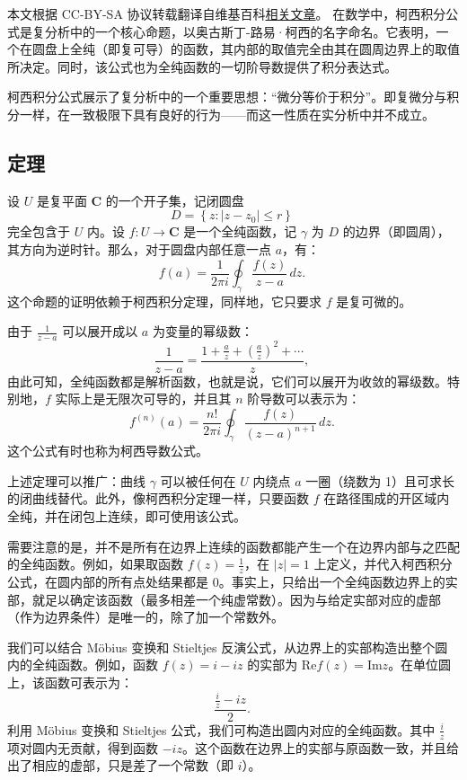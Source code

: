 
本文根据 CC-BY-SA 协议转载翻译自维基百科\href{https://en.wikipedia.org/wiki/Cauchy\%27s_integral_formula}{相关文章}。
在数学中，柯西积分公式是复分析中的一个核心命题，以奥古斯丁-路易·柯西的名字命名。它表明，一个在圆盘上全纯（即复可导）的函数，其内部的取值完全由其在圆周边界上的取值所决定。同时，该公式也为全纯函数的一切阶导数提供了积分表达式。

柯西积分公式展示了复分析中的一个重要思想：“微分等价于积分”。即复微分与积分一样，在一致极限下具有良好的行为——而这一性质在实分析中并不成立。
\subsection{定理}
设 $U$ 是复平面 $\mathbf{C}$ 的一个开子集，记闭圆盘
$$
D = \left\{ z : |z - z_0| \leq r \right\}~
$$
完全包含于 $U$ 内。设 $f: U \to \mathbf{C}$ 是一个全纯函数，记 $\gamma$ 为 $D$ 的边界（即圆周），其方向为逆时针。那么，对于圆盘内部任意一点 $a$，有：
$$
f(a) = \frac{1}{2\pi i} \oint_{\gamma} \frac{f(z)}{z - a} \, dz.~
$$
这个命题的证明依赖于柯西积分定理，同样地，它只要求 $f$ 是复可微的。

由于 $\frac{1}{z - a}$ 可以展开成以 $a$ 为变量的幂级数：
$$
\frac{1}{z - a} = \frac{1 + \frac{a}{z} + \left( \frac{a}{z} \right)^2 + \cdots}{z}  ,~
$$
由此可知，全纯函数都是解析函数，也就是说，它们可以展开为收敛的幂级数。特别地，$f$ 实际上是无限次可导的，并且其 $n$ 阶导数可以表示为：
$$
f^{(n)}(a) = \frac{n!}{2\pi i} \oint_{\gamma} \frac{f(z)}{(z - a)^{n+1}} \, dz.~
$$
这个公式有时也称为柯西导数公式。

上述定理可以推广：曲线 $\gamma$ 可以被任何在 $U$ 内绕点 $a$ 一圈（绕数为 1）且可求长的闭曲线替代。此外，像柯西积分定理一样，只要函数 $f$ 在路径围成的开区域内全纯，并在闭包上连续，即可使用该公式。

需要注意的是，并不是所有在边界上连续的函数都能产生一个在边界内部与之匹配的全纯函数。例如，如果取函数 $f(z) = \frac{1}{z}$，在 $|z| = 1$ 上定义，并代入柯西积分公式，在圆内部的所有点处结果都是 0。事实上，只给出一个全纯函数边界上的实部，就足以确定该函数（最多相差一个纯虚常数）。因为与给定实部对应的虚部（作为边界条件）是唯一的，除了加一个常数外。

我们可以结合 Möbius 变换和 Stieltjes 反演公式，从边界上的实部构造出整个圆内的全纯函数。例如，函数 $f(z) = i - iz$ 的实部为 $\text{Re} f(z) = \text{Im} z$。在单位圆上，该函数可表示为：
$$
\frac{\frac{i}{z} - iz}{2}.~
$$
利用 Möbius 变换和 Stieltjes 公式，我们可构造出圆内对应的全纯函数。其中 $\frac{i}{z}$ 项对圆内无贡献，得到函数 $-iz$。这个函数在边界上的实部与原函数一致，并且给出了相应的虚部，只是差了一个常数（即 $i$）。
